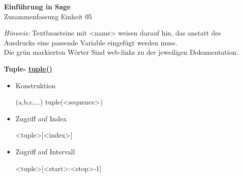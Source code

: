 \documentclass[a4paper,9pt,DIV15,twocolumn]{scrartcl}
\begin{document}
\begin{center}
    \textbf{\LARGE Einführung in Sage}\\
    {\large Zusammenfassung Einheit 05}
\end{center}
\textsl{Hinweis:} Textbausteine mit <name> weisen darauf hin, das anstatt des Ausdrucks eine passende Variable eingefügt werden muss.\\
Die {\color{Green}grün} markierten Wörter Sind web-links zu der jeweiligen Dokumentation.

\medskip
\textbf{Tuple- } \href{http://docs.python.org/library/functions.html#tuple}{\textbf{tuple()}}
\begin{itemize}
 \item Konstruktion
\begin{sagein}
 (a,b,c,...)
 tuple(<sequence>)
\end{sagein}
 \item Zugriff auf Index
\begin{sagein}
<tuple>[<index>]
\end{sagein}
 \item Zugriff auf Intervall
\begin{sagein}
<tuple>[<start>:<stop>-1]
\end{sagein}
\end{itemize}
\end{document}
